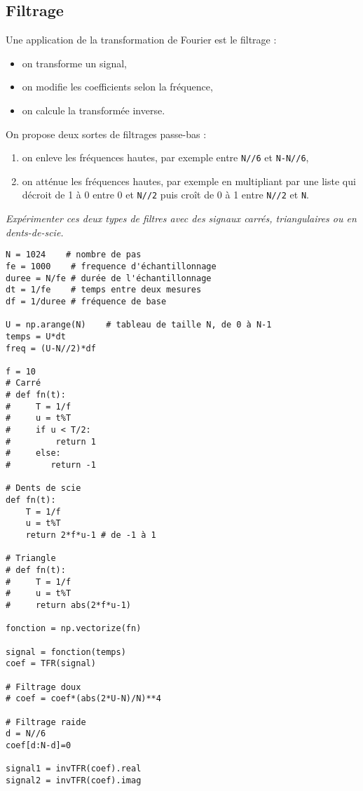 \subsection{Filtrage}
Une application de la transformation de Fourier est le filtrage :
\begin{itemize}
 \item on transforme un signal,
 \item on modifie les coefficients selon la fréquence,
 \item on calcule la transformée inverse.
\end{itemize}

On propose deux sortes de filtrages passe-bas :
\begin{enumerate}
 \item on enleve les fréquences hautes, par exemple entre {\tt N//6} et {\tt N-N//6},
 \item on atténue les fréquences hautes, par exemple en multipliant par une liste qui décroit de 1 à 0 entre 0 et {\tt N//2} 
 puis croît de 0 à 1 entre {\tt N//2} et {\tt N}.
\end{enumerate}
\begin{Exercise}\it Expérimenter ces deux types de filtres avec des signaux carrés, triangulaires ou en dents-de-scie.
\end{Exercise}
\begin{Answer}
\begin{lstlisting}
N = 1024    # nombre de pas
fe = 1000    # frequence d'échantillonnage
duree = N/fe # durée de l'échantillonnage
dt = 1/fe    # temps entre deux mesures
df = 1/duree # fréquence de base
  
U = np.arange(N)    # tableau de taille N, de 0 à N-1
temps = U*dt
freq = (U-N//2)*df

f = 10
# Carré
# def fn(t):
#     T = 1/f
#     u = t%T
#     if u < T/2:
#         return 1
#     else:
#        return -1

# Dents de scie
def fn(t):
    T = 1/f
    u = t%T
    return 2*f*u-1 # de -1 à 1

# Triangle
# def fn(t):
#     T = 1/f
#     u = t%T
#     return abs(2*f*u-1)

fonction = np.vectorize(fn)

signal = fonction(temps)
coef = TFR(signal)

# Filtrage doux
# coef = coef*(abs(2*U-N)/N)**4

# Filtrage raide
d = N//6
coef[d:N-d]=0 

signal1 = invTFR(coef).real
signal2 = invTFR(coef).imag
\end{lstlisting}
\end{Answer}
